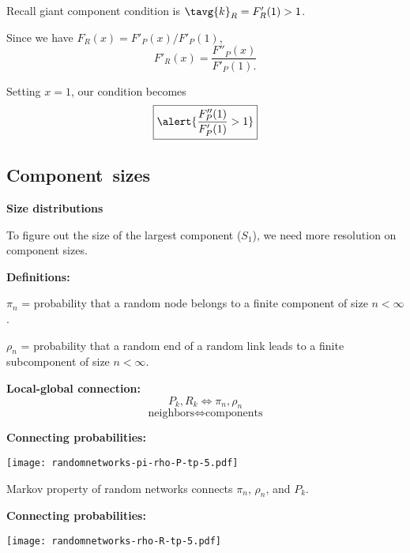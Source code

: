 \begin{frame}[label=]
\begin{frame}[label=]
\begin{frame}[label=]
\begin{frame}[label=]
\begin{frame}[label=]
\begin{frame}[label=]
\begin{frame}[label=]
\begin{frame}[label=]
  
   Recall giant component condition is
    $\tavg{k}_R = F'_R(1) > 1$.
  
    Since we have $F_R(x) = F'_P(x)/F'_P(1)$,
    {
    $$
    F'_R(x)
    =
    \frac{
      F''_P(x)
    }
    {
      F'_P(1).
    }
    $$
  }
  
    Setting $x=1$, our condition becomes
    $$
    \boxed{
      \alert{
        \frac{
          F''_P(1)
        }
        {
          F'_P(1)
        }
        > 1
      }}
    $$
  


\subsection{Component\ sizes}

\begin{frame}[label=]
  \textbf{Size distributions}
  
    To figure out the \alert{size of the largest component}
    ($S_1$), we need
    more resolution on component sizes.

    \textbf{Definitions:}
      
       
        \alert{$\pi_n$} = probability that a random node
        belongs to a finite component of size $n < \infty$.
       
        \alert{$\rho_n$} = probability 
        that a random end of a random link leads to 
        a finite subcomponent of size $n < \infty$.
      
    
    \textbf{Local-global connection:}
      \alert{
        $$
        P_k, R_k \Leftrightarrow \pi_n, \rho_n
        $$
        $$
        \mbox{neighbors}
        \Leftrightarrow
        \mbox{components}
        $$
      }
    
  

\begin{frame}[label=]
  \textbf{Connecting probabilities:}

  \texttt{[image: randomnetworks-pi-rho-P-tp-5.pdf]}

  
   
    Markov property of random networks connects 
    $\pi_n$, $\rho_n$, and $P_k$.
  


\begin{frame}[label=]
  \textbf{Connecting probabilities:}

  \texttt{[image: randomnetworks-rho-R-tp-5.pdf]}

  
   

\end{frame}
\end{frame}
\end{frame}
\end{frame}
\end{frame}
\end{frame}
\end{frame}
\end{frame}
\end{frame}
\end{frame}
\end{frame}
